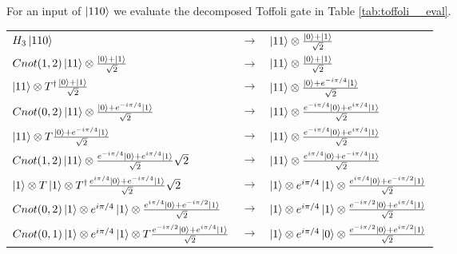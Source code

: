 \documentclass[12pt,a4paper]{article}
\begin{document}
For an input of \(\ket{110}\) we evaluate the decomposed Toffoli gate in Table \ref{tab:toffoli__eval}. \\

\begin{table}[h!]
    \centering
    \begin{tabular}{lcl}
        
        $H_3\ket{110}$    &  $ \rightarrow$   &    $\ket{11} \otimes \frac{\ket{0} + \ket{1}}{\sqrt{2}}$  \\  
        
        $Cnot(1,2) \ket{11} \otimes \frac{\ket{0} + \ket{1}}{\sqrt{2}}$    &  $ \rightarrow$   &    $\ket{11} \otimes \frac{\ket{0} + \ket{1}}{\sqrt{2}}$  \\  
        
        $\ket{11} \otimes T^{\dagger}\frac{\ket{0} + \ket{1}}{\sqrt{2}}$    &  $ \rightarrow$   &    $\ket{11} \otimes \frac{\ket{0} + e^{-i\pi/4}\ket{1}}{\sqrt{2}}$  \\
        
        $Cnot(0,2) \ket{11} \otimes \frac{\ket{0} + e^{-i\pi/4}\ket{1}}{\sqrt{2}}$    &  $ \rightarrow$   &    $\ket{11} \otimes \frac{e^{-i\pi/4}\ket{0} + e^{i\pi/4}\ket{1}}{\sqrt{2}}$  \\  
        
        $\ket{11} \otimes T\frac{\ket{0} + e^{-i\pi/4}\ket{1}}{\sqrt{2}}$    &  $ \rightarrow$   &    $\ket{11} \otimes \frac{e^{-i\pi/4}\ket{0} + e^{i\pi/4}\ket{1}}{\sqrt{2}}$  \\  
        $Cnot(1,2) \ket{11} \otimes \frac{e^{-i\pi/4}\ket{0} + e^{i\pi/4}\ket{1}}{\sqrt{2}}{\sqrt{2}}$    &  $\rightarrow $   &    $\ket{11} \otimes \frac{e^{i\pi/4}\ket{0} + e^{-i\pi/4}\ket{1}}{\sqrt{2}}$  \\  
        
        $\ket{1}\otimes T\ket{1} \otimes T^{\dagger}\frac{e^{i\pi/4}\ket{0} + e^{-i\pi/4}\ket{1}}{\sqrt{2}}{\sqrt{2}}$    &  $ \rightarrow$   &    $\ket{1}\otimes e^{i\pi/4}\ket{1} \otimes \frac{e^{i\pi/4}\ket{0} + e^{-i\pi/2}\ket{1}}{\sqrt{2}}$  \\  
        
        $Cnot(0,2)\ket{1}\otimes e^{i\pi/4}\ket{1} \otimes \frac{e^{i\pi/4}\ket{0} + e^{-i\pi/2}\ket{1}}{\sqrt{2}}$    &  
        $ \rightarrow$   &    
        $\ket{1}\otimes e^{i\pi/4}\ket{1} \otimes \frac{e^{-i\pi/2}\ket{0} + e^{i\pi/4}\ket{1}}{\sqrt{2}}$  \\ 

        $Cnot(0,1)\ket{1}\otimes e^{i\pi/4}\ket{1} \otimes T \frac{e^{-i\pi/2}\ket{0} + e^{i\pi/4}\ket{1}}{\sqrt{2}}$    
        &  $ \rightarrow$   &    
        $\ket{1}\otimes e^{i\pi/4}\ket{0} \otimes \frac{e^{-i\pi/2}\ket{0} + e^{i\pi/2}\ket{1}}{\sqrt{2}}$  \\ 
        

\end{tabular}
\end{table}
\end{document}
